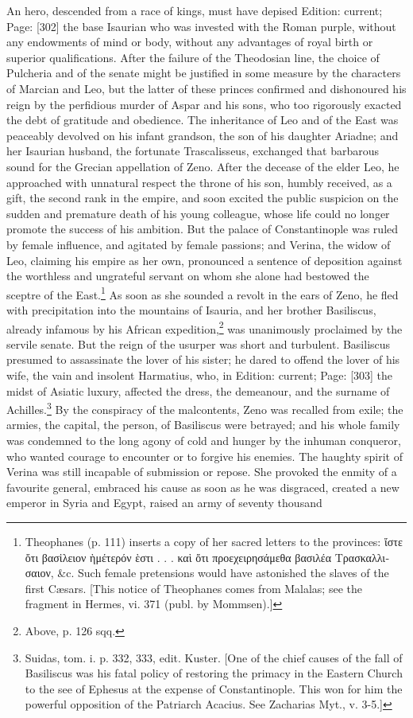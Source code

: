 An hero, descended from a race of kings, must have depised Edition: current; Page: [302] the base Isaurian who was invested with the Roman purple, without any endowments of mind or body, without any advantages of royal birth or superior qualifications. After the failure of the Theodosian line, the choice of Pulcheria and of the senate might be justified in some measure by the characters of Marcian and Leo, but the latter of these princes confirmed and dishonoured his reign by the perfidious murder of Aspar and his sons, who too rigorously exacted the debt of gratitude and obedience. The inheritance of Leo and of the East was peaceably devolved on his infant grandson, the son of his daughter Ariadne; and her Isaurian husband, the fortunate Trascalisseus, exchanged that barbarous sound for the Grecian appellation of Zeno. After the decease of the elder Leo, he approached with unnatural respect the throne of his son, humbly received, as a gift, the second rank in the empire, and soon excited the public suspicion on the sudden and premature death of his young colleague, whose life could no longer promote the success of his ambition. But the palace of Constantinople was ruled by female influence, and agitated by female passions; and Verina, the widow of Leo, claiming his empire as her own, pronounced a sentence of deposition against the worthless and ungrateful servant on whom she alone had bestowed the sceptre of the East.\footnote{Theophanes (p. 111) inserts a copy of her sacred letters to the provinces: \textgreek{\texthebrew{ἴ}στε \texthebrew{ὄ}τι βασ\texthebrew{ἱ}λειον \texthebrew{ὴ}μέτερόν \texthebrew{ὲ}στι . . . κα\texthebrew{ὶ ὄ}τι προεχειρησάμεθα βασιλέα Τρασκαλλισαιον}, \&c. Such female pretensions would have astonished the slaves of the first Cæsars. [This notice of Theophanes comes from Malalas; see the fragment in Hermes, vi. 371 (publ. by Mommsen).]} As soon as she sounded a revolt in the ears of Zeno, he fled with precipitation into the mountains of Isauria, and her brother Basiliscus, already infamous by his African expedition,\footnote{Above, p. 126 sqq.} was unanimously proclaimed by the servile senate. But the reign of the usurper was short and turbulent. Basiliscus presumed to assassinate the lover of his sister; he dared to offend the lover of his wife, the vain and insolent Harmatius, who, in Edition: current; Page: [303] the midst of Asiatic luxury, affected the dress, the demeanour, and the surname of Achilles.\footnote{Suidas, tom. i. p. 332, 333, edit. Kuster. [One of the chief causes of the fall of Basiliscus was his fatal policy of restoring the primacy in the Eastern Church to the see of Ephesus at the expense of Constantinople. This won for him the powerful opposition of the Patriarch Acacius. See Zacharias Myt., v. 3-5.]} By the conspiracy of the malcontents, Zeno was recalled from exile; the armies, the capital, the person, of Basiliscus were betrayed; and his whole family was condemned to the long agony of cold and hunger by the inhuman conqueror, who wanted courage to encounter or to forgive his enemies. The haughty spirit of Verina was still incapable of submission or repose. She provoked the enmity of a favourite general, embraced his cause as soon as he was disgraced, created a new emperor in Syria and Egypt, raised an army of seventy thousand 